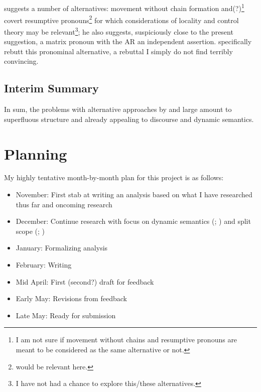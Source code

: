 \documentclass[11pt]{article}
\begin{document}
\subsection{\citet{vonfintelAmountRelativesMeaning1999}}
\citet{vonfintelAmountRelativesMeaning1999} suggests a number of alternatives: movement without chain formation and(?)\footnote{I am not sure if movement without chains and resumptive pronouns are meant to be considered as the same alternative or not.} covert resumptive pronouns\footnote{\citet{postalContrastingExtractionTypes1994} would be relevant here.} for which considerations of locality and control theory may be relevant\footnote{I have not had a chance to explore this/these alternatives.}; he also suggests, suspiciously close to the present suggestion, a matrix pronoun with the AR an independent assertion. \citet{grosuAmountRelatives2017} specifically rebutt this pronominal alternative, a rebuttal I simply do not find terribly convincing.

\subsection{Interim Summary}

In sum, the problems with alternative approaches by and large amount to superfluous structure and already appealing to discourse and dynamic semantics.

\section{Planning}

My highly tentative month-by-month plan for this project is as follows:
\begin{itemize}
	\item {November: First stab at writing an analysis based on what I have researched thus far and oncoming research}
	\item {December: Continue research with focus on dynamic semantics (\cite{heimSemanticsDefiniteIndefinite1982}; \cite{groenendijkDynamicPredicateLogic1991}) and split scope (\cite{abelsUnifiedApproachSplit2010}; \cite{bumfordSplitscopeEffectsDefinite2017})}
	\item {January: Formalizing analysis}
	\item {February: Writing}
	\item {Mid April: First (second?) draft for feedback}
	\item {Early May: Revisions from feedback}
	\item {Late May: Ready for submission}
\end{itemize}

\printbibliography
\end{document}
